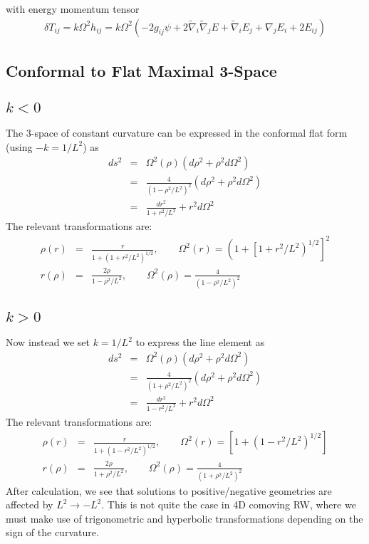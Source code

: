 \documentclass[10pt,letterpaper]{article}
\numberwithin{equation}{section}
\begin{document}
with energy momentum tensor
\begin{eqnarray}
\delta T_{ij} = k\Omega^2 h_{ij}= k \Omega^2 (-2 g_{ij}\psi + 2\tilde\nabla_i\tilde\nabla_j E + \tilde\nabla_i E_j + \nabla_j E_i + 2E_{ij})
\end{eqnarray}
\newpage
\begin{appendices}
\section{Conformal to Flat Maximal 3-Space}
\subsection{$k<0$}
The 3-space of constant curvature can be expressed in the conformal flat form (using $-k = 1/L^2$) as
\begin{eqnarray}
ds^2 &=& \Omega^2(\rho)\left( d\rho^2 + \rho^2 d\Omega^2\right)\\
&=& \frac{4}{\left(1-\rho^2/L^2\right)^2}\left( d\rho^2 + \rho^2 d\Omega^2\right)\\
&=& \frac{dr^2}{1+r^2/L^2} + r^2 d\Omega^2
\end{eqnarray}
The relevant transformations are:
\begin{eqnarray}
\rho(r) &=& \frac{r}{1+\left(1+r^2/L^2\right)^{1/2}},\qquad \Omega^2(r) = \left(1+\left[1+r^2/L^2\right)^{1/2}\right]^2
\nonumber\\
r(\rho) &=& \frac{2\rho}{1-\rho^2/L^2},\qquad \Omega^2(\rho) = \frac{4}{\left(1-\rho^2/L^2\right)^2}
\end{eqnarray}

\subsection{$k>0$}
Now instead we set $k = 1/L^2$ to express the line element as
\begin{eqnarray}
ds^2 &=& \Omega^2(\rho)\left( d\rho^2 + \rho^2 d\Omega^2\right)\\
&=& \frac{4}{\left(1+\rho^2/L^2\right)^2}\left( d\rho^2 + \rho^2 d\Omega^2\right)
\label{k>0cf}\\
&=& \frac{dr^2}{1-r^2/L^2} + r^2 d\Omega^2
\end{eqnarray}
The relevant transformations are:
\begin{eqnarray}
\rho(r) &=& \frac{r}{1+\left(1-r^2/L^2\right)^{1/2}},\qquad \Omega^2(r) = \left[1+\left(1-r^2/L^2\right)^{1/2}\right]
\nonumber\\
r(\rho) &=& \frac{2\rho}{1+\rho^2/L^2},\qquad \Omega^2(\rho) = \frac{4}{\left(1+\rho^2/L^2\right)^2}
\end{eqnarray}
After calculation, we see that solutions to positive/negative geometries are affected by $L^2 \to - L^2$. This is not quite the case in 4D comoving RW, where we must make use of trigonometric and hyperbolic transformations depending on the sign of the curvature.


\end{appendices}
\end{document}
